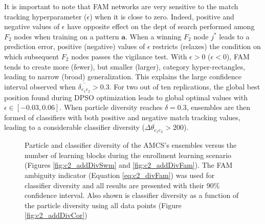 It is important to note that FAM networks are very sensitive to the match tracking hyperparameter ($\epsilon$) when it is close to zero.
Indeed, positive and negative values of $\epsilon$ have opposite effect on the dept of search performed among $F_2$ nodes when training on a pattern $\textbf{a}$.
When a winning $F_2$ node $j^*$ leads to a prediction error, positive (negative) values of $\epsilon$ restricts (relaxes) the condition on which subsequent $F_2$ nodes passes the vigilance test.
With $\epsilon>0$ ($\epsilon<0$), FAM tends to create more (fewer), but smaller (larger), category hyper-rectangles, leading to narrow (broad) generalization.
This explains the large confidence interval observed when $\overline{\delta_{e_1e_2}} > 0.3$.
For two out of ten replications, the global best position found during DPSO optimization leads to global optimal values with $\epsilon \in [-0.03, 0.06]$. 
When particle diversity reaches $\delta=0.3$, ensembles are then formed of classifiers with both positive and negative match tracking values, leading to a considerable classifier diversity ($\overline{\Delta\theta_{e_1e_2}} > 200$).

\begin{figure*}[t]
  \centering
	\caption{Particle and classifier diversity of the AMCS's ensembles versus the number of learning blocks during the enrollment learning scenario (Figures \ref{fig:c2_addDivSwm} and \ref{fig:c2_addDivFam}).
The FAM ambiguity indicator (Equation \ref{eq:c2_divFam}) was used for classifier diversity and all results are presented with their 90\% confidence interval.
Also shown is classifier diversity as a function of the particle diversity using all data points (Figure \ref{fig:c2_addDivCor})}
	\label{fig:c2_addDiv}
\end{figure*}


